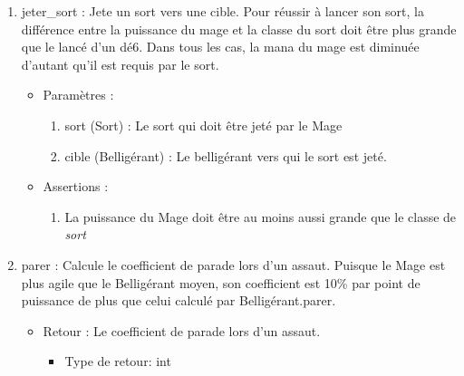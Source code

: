 \documentclass[12pt,pdftex,oneside]{article}
\begin{document}
\begin{itemize}
    \begin{enumerate}
    \item jeter\_sort : Jete un sort vers une cible. Pour réussir à lancer son sort, la
      différence entre la puissance du mage et la classe du sort doit être plus
      grande que le lancé d'un dé6. Dans tous les cas, la mana du mage est diminuée d'autant qu'il est requis par le sort.
      \begin{itemize}
      \item Paramètres : 
        \begin{enumerate}
        \item sort (Sort) : Le sort qui doit être jeté par le Mage
        \item cible (Belligérant) : Le belligérant vers qui le sort est jeté.
        \end{enumerate}
      \item Assertions : 
        \begin{enumerate}
        \item La puissance du Mage doit être au moins aussi grande que le classe
          de \emph{sort}
        \end{enumerate}
      \end{itemize}

    \item parer : Calcule le coefficient de parade lors d'un assaut. Puisque le
      Mage est plus agile que le Belligérant moyen, son coefficient est 10\% par
      point de puissance de plus que celui calculé par Belligérant.parer.
      \begin{itemize}
      \item Retour : Le coefficient de parade lors d'un assaut.
          \begin{itemize}
          \item Type de retour: int
          \end{itemize}
      \end{itemize}
    \end{enumerate}


\end{itemize}
\end{document}
